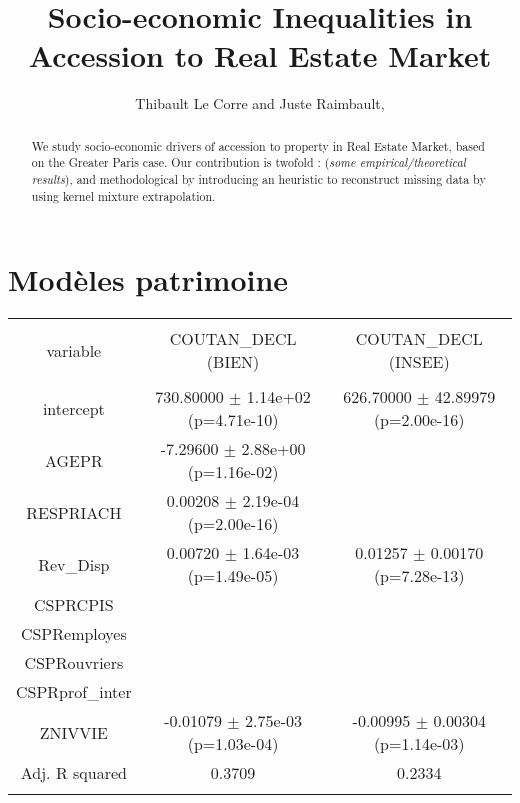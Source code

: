 

\title{
Socio-economic Inequalities in Accession to Real Estate Market
}

\author{Thibault Le Corre and Juste Raimbault,}




\begin{abstract}
We study socio-economic drivers of accession to property in Real Estate Market, based on the Greater Paris case. Our contribution is twofold : (\textit{some empirical/theoretical results}), and methodological by introducing an heuristic to reconstruct missing data by using kernel mixture extrapolation.
\end{abstract}


\maketitle





\section*{Modèles patrimoine}


\begin{table*}[!htbp] \centering 
  \caption{} 
  \label{} 
\begin{tabular}{@{\extracolsep{5pt}} ccc} 
\\[-1.8ex]\hline 
\hline \\[-1.8ex] 
variable & COUTAN\_DECL (BIEN) & COUTAN\_DECL (INSEE) \\ 
\hline \\[-1.8ex] 
intercept & 730.80000 $\pm$ 1.14e+02 (p=4.71e-10) & 626.70000 $\pm$ 42.89979 (p=2.00e-16) \\ 
AGEPR &  -7.29600 $\pm$ 2.88e+00 (p=1.16e-02) &  \\ 
RESPRIACH &   0.00208 $\pm$ 2.19e-04 (p=2.00e-16) &  \\ 
Rev\_Disp &   0.00720 $\pm$ 1.64e-03 (p=1.49e-05) &   0.01257 $\pm$  0.00170 (p=7.28e-13) \\ 
CSPRCPIS &  &  \\ 
CSPRemployes &  &  \\ 
CSPRouvriers &  &  \\ 
CSPRprof\_inter &  &  \\ 
ZNIVVIE &  -0.01079 $\pm$ 2.75e-03 (p=1.03e-04) &  -0.00995 $\pm$  0.00304 (p=1.14e-03) \\ 
\hline Adj. R squared & 0.3709 & 0.2334 \\ 
\hline \\[-1.8ex] 
\end{tabular} 
\end{table*} 


